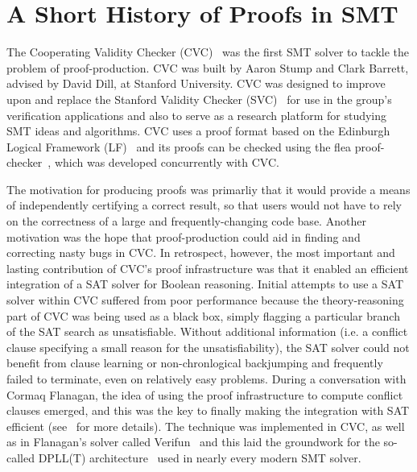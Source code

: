 \documentclass{llncs}
\begin{document}


\section{A Short History of Proofs in SMT}
\label{sec:history}
The Cooperating Validity Checker (CVC)~\cite{SBD02} was the first SMT solver to
tackle the problem of proof-production.  CVC was built by Aaron Stump and Clark
Barrett, advised by David Dill, at Stanford University.  CVC was designed to
improve upon and replace the Stanford Validity Checker (SVC)~\cite{BDL96} for
use in the group's verification applications and also to serve as a research
platform for studying SMT ideas and algorithms.    CVC
uses a proof format based on the Edinburgh Logical Framework (LF)~\cite{HHP93}
and its proofs can be checked using the flea proof-checker~\cite{SBD02b,SD02}, which was
developed concurrently with CVC.

The motivation for producing proofs was primarliy that it would provide a means
of independently certifying a correct result,
so that users would not have to rely on the correctness of a large and
frequently-changing code base.  Another motivation was the hope that
proof-production could aid in finding and correcting nasty bugs in CVC.
In retrospect, however, the most important and lasting contribution of CVC's
proof infrastructure was that it enabled an efficient integration of a SAT
solver for Boolean reasoning.  Initial attempts to use a SAT solver within
CVC suffered from poor performance because the theory-reasoning part of CVC
was being used as a black box, simply flagging a particular branch of the SAT
search as unsatisfiable.  Without additional information (i.e. a conflict
clause specifying a small reason for the unsatisfiability), the SAT solver could
not benefit from clause learning or non-chronlogical backjumping and frequently
failed to terminate, even on relatively easy problems.  During a conversation
with Cormaq Flanagan, the idea of using the proof infrastructure to compute
conflict clauses emerged, and this was the key to finally making the
integration with SAT efficient (see~\cite{BDS02-CAV02} for more details).  The
technique was implemented in CVC, as well as in Flanagan's solver called
Verifun~\cite{FJO+03} and this laid the groundwork for the so-called DPLL(T)
architecture~\cite{NieOT-JACM-06} used in nearly every modern SMT solver.
\end{document}
